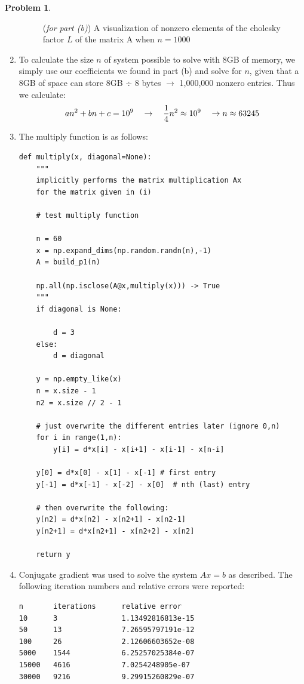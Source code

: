 \documentclass[10pt]{article}
\theoremstyle{definition}
\newtheorem{prob}{Problem}
\begin{document}
\begin{prob}
\begin{enumerate}[\bfseries(a)]
\begin{figure}
    \caption{(\textit{for part (b)}) A visualization of nonzero elements of the cholesky factor $L$ of the matrix A when $n=1000$}
\end{figure}
\item To calculate the size $n$ of system possible to solve with 8GB of memory, we simply use our coefficients we found in part (b) and solve for $n$, given that a 8GB of space can store 8GB $\div$ 8 bytes $\rightarrow$ 1,000,000 nonzero entries. Thus we calculate:
\[
	a n^2 + bn + c = 10^9 \quad \rightarrow \quad 
	\frac{1}{4}n^2 \approx 10^9 \quad \rightarrow \quad \\
	n \approx 63245
\]
\clearpage
\item The multiply function is as follows:
\begin{lstlisting}
def multiply(x, diagonal=None):
    """
    implicitly performs the matrix multiplication Ax
    for the matrix given in (i)

    # test multiply function
    
    n = 60
    x = np.expand_dims(np.random.randn(n),-1)
    A = build_p1(n)

    np.all(np.isclose(A@x,multiply(x))) -> True
    """ 
    if diagonal is None:

        d = 3
    else:
        d = diagonal

    y = np.empty_like(x)
    n = x.size - 1
    n2 = x.size // 2 - 1
    
    # just overwrite the different entries later (ignore 0,n)
    for i in range(1,n):
        y[i] = d*x[i] - x[i+1] - x[i-1] - x[n-i]

    y[0] = d*x[0] - x[1] - x[-1] # first entry
    y[-1] = d*x[-1] - x[-2] - x[0]  # nth (last) entry

    # then overwrite the following:
    y[n2] = d*x[n2] - x[n2+1] - x[n2-1]
    y[n2+1] = d*x[n2+1] - x[n2+2] - x[n2]

    return y 
\end{lstlisting}

\item Conjugate gradient was used to solve the system $Ax=b$ as described. The following iteration numbers and relative errors were reported:
\begin{verbatim}
n		iterations		relative error
10 		3 				1.13492816813e-15
50 		13 				7.26595797191e-12
100 	26 				2.12606603652e-08
5000	1544 			6.25257025384e-07
15000 	4616 			7.0254248905e-07
30000 	9216 			9.29915260829e-07
\end{verbatim}


\end{enumerate}
\end{prob}
\end{document}
